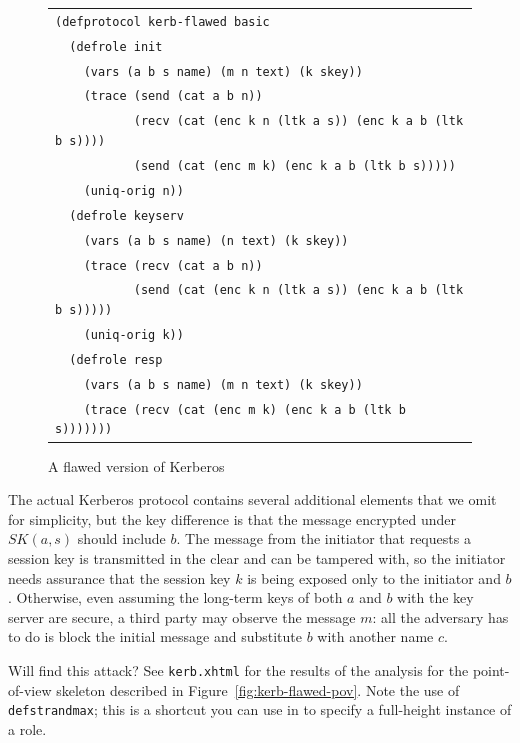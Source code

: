 \begin{figure}
\centering
\begin{tabular}{l}
\verb|(defprotocol kerb-flawed basic|\\
\verb|  (defrole init|\\
\verb|    (vars (a b s name) (m n text) (k skey))|\\
\verb|    (trace (send (cat a b n))|\\
\verb|           (recv (cat (enc k n (ltk a s)) (enc k a b (ltk b s))))|\\
\verb|           (send (cat (enc m k) (enc k a b (ltk b s)))))|\\
\verb|    (uniq-orig n))|\\
\verb|  (defrole keyserv|\\
\verb|    (vars (a b s name) (n text) (k skey))|\\
\verb|    (trace (recv (cat a b n))|\\
\verb|           (send (cat (enc k n (ltk a s)) (enc k a b (ltk b s)))))|\\
\verb|    (uniq-orig k))|\\
\verb|  (defrole resp|\\
\verb|    (vars (a b s name) (m n text) (k skey))|\\
\verb|    (trace (recv (cat (enc m k) (enc k a b (ltk b s)))))))|\\
\end{tabular}
\caption{A flawed version of Kerberos}
\label{fig:kerb-flawed defprotocol}
\end{figure}

The actual Kerberos protocol contains several additional elements that
we omit for simplicity, but the key difference is that the message
encrypted under $SK(a,s)$ should include $b$.  The message from the
initiator that requests a session key is transmitted in the clear and
can be tampered with, so the initiator needs assurance that the
session key $k$ is being exposed only to the initiator and $b$.
Otherwise, even assuming the long-term keys of both $a$ and $b$ with
the key server are secure, a third party may observe the message $m$:
all the adversary has to do is block the initial message and substitute
$b$ with another name $c$.

Will {\cpsa} find this attack?  See \texttt{kerb.xhtml} for the
results of the analysis for the point-of-view skeleton described in
Figure~\ref{fig:kerb-flawed-pov}.  Note the use of
\texttt{defstrandmax}; this is a shortcut you can use in \cpsa to
specify a full-height instance of a role.

